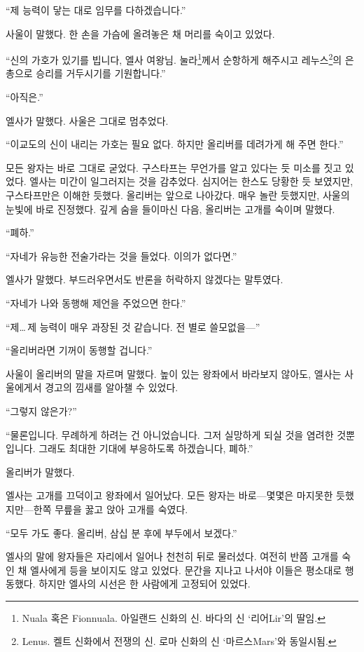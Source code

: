 ``제 능력이 닿는 대로 임무를 다하겠습니다.''

사울이 말했다. 한 손을 가슴에 올려놓은 채 머리를 숙이고 있었다.

``신의 가호가 있기를 빕니다, 엘사 여왕님. 눌라\footnote{Nuala 혹은 Fionnuala. 아일랜드 신화의 신. 바다의 신 `리어Lir'의 딸임.}께서 순항하게 해주시고 레누스\footnote{Lenus. 켈트 신화에서 전쟁의 신. 로마 신화의 신 `마르스Mars'와 동일시됨.}의 은총으로 승리를 거두시기를 기원합니다.''

``아직은.''

엘사가 말했다. 사울은 그대로 멈추었다.

``이교도의 신이 내리는 가호는 필요 없다. 하지만 올리버를 데려가게 해 주면 한다.''

모든 왕자는 바로 그대로 굳었다. 구스타프는 무언가를 알고 있다는 듯 미소를 짓고 있었다. 엘사는 미간이 일그러지는 것을 감추었다. 심지어는 한스도 당황한 듯 보였지만, 구스타프만은 이해한 듯했다. 올리버는 앞으로 나아갔다. 매우 놀란 듯했지만, 사울의 눈빛에 바로 진정했다. 깊게 숨을 들이마신 다음, 올리버는 고개를 숙이며 말했다.

``폐하.''

``자네가 유능한 전술가라는 것을 들었다. 이의가 없다면.''

엘사가 말했다. 부드러우면서도 반론을 허락하지 않겠다는 말투였다.

``자네가 나와 동행해 제언을 주었으면 한다.''

``제\ldots\,제 능력이 매우 과장된 것 같습니다. 전 별로 쓸모없을—''

``올리버라면 기꺼이 동행할 겁니다.''

사울이 올리버의 말을 자르며 말했다. 높이 있는 왕좌에서 바라보지 않아도, 엘사는 사울에게서 경고의 낌새를 알아챌 수 있었다.

``그렇지 않은가?''

``물론입니다. 무례하게 하려는 건 아니었습니다. 그저 실망하게 되실 것을 염려한 것뿐입니다. 그래도 최대한 기대에 부응하도록 하겠습니다, 폐하.''

올리버가 말했다.

엘사는 고개를 끄덕이고 왕좌에서 일어났다. 모든 왕자는 바로—몇몇은 마지못한 듯했지만—한쪽 무릎을 꿇고 앉아 고개를 숙였다.

``모두 가도 좋다. 올리버, 삼십 분 후에 부두에서 보겠다.''

엘사의 말에 왕자들은 자리에서 일어나 천천히 뒤로 물러섰다. 여전히 반쯤 고개를 숙인 채 엘사에게 등을 보이지도 않고 있었다. 문간을 지나고 나서야 이들은 평소대로 행동했다. 하지만 엘사의 시선은 한 사람에게 고정되어 있었다.

